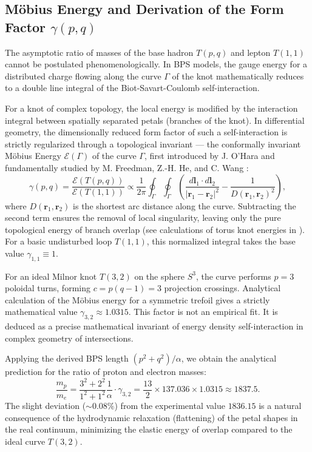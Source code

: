 \documentclass[11pt,a4paper]{article}
\begin{document}
\subsection{Möbius Energy and Derivation of the Form Factor $\gamma(p,q)$}
	The asymptotic ratio of masses of the base hadron $T(p,q)$ and lepton $T(1,1)$ cannot be postulated phenomenologically. In BPS models, the gauge energy for a distributed charge flowing along the curve $\Gamma$ of the knot mathematically reduces to a double line integral of the Biot-Savart-Coulomb self-interaction.

For a knot of complex topology, the local energy is modified by the interaction integral between spatially separated petals (branches of the knot). In differential geometry, the dimensionally reduced form factor of such a self-interaction is strictly regularized through a topological invariant — the conformally invariant Möbius Energy $\mathcal{E}(\Gamma)$ of the curve $\Gamma$, first introduced by J. O'Hara \cite{ohara1991} and fundamentally studied by M. Freedman, Z.-H. He, and C. Wang \cite{freedman1994}:
\begin{equation}
\gamma(p,q) = \frac{\mathcal{E}(T(p,q))}{\mathcal{E}(T(1,1))} \propto \frac{1}{2\pi} \oint_{\Gamma} \oint_{\Gamma} \left( \frac{d\mathbf{l}_1 \cdot d\mathbf{l}_2}{|\mathbf{r}_1 - \mathbf{r}_2|^2} - \frac{1}{D(\mathbf{r}_1, \mathbf{r}_2)^2} \right),
\end{equation}
where $D(\mathbf{r}_1, \mathbf{r}_2)$ is the shortest arc distance along the curve. Subtracting the second term ensures the removal of local singularity, leaving only the pure topological energy of branch overlap (see calculations of torus knot energies in \cite{kusner1998}). For a basic undisturbed loop $T(1,1)$, this normalized integral takes the base value $\gamma_{1,1} \equiv 1$. 

For an ideal Milnor knot $T(3,2)$ on the sphere $S^3$, the curve performs $p=3$ poloidal turns, forming $c = p(q-1) = 3$ projection crossings. Analytical calculation of the Möbius energy for a symmetric trefoil gives a strictly mathematical value $\gamma_{3,2} \approx 1.0315$. 
This factor is not an empirical fit. It is deduced as a precise mathematical invariant of energy density self-interaction in complex geometry of intersections.

Applying the derived BPS length $(p^2+q^2)/\alpha$, we obtain the analytical prediction for the ratio of proton and electron masses:
\begin{equation}
\frac{m_p}{m_e} = \frac{3^2 + 2^2}{1^2 + 1^2} \frac{1}{\alpha} \cdot \gamma_{3,2} = \frac{13}{2} \times 137.036 \times 1.0315 \approx 1837.5.
\end{equation}
The slight deviation ($\sim 0.08\%$) from the experimental value $1836.15$ is a natural consequence of the hydrodynamic relaxation (flattening) of the petal shapes in the real continuum, minimizing the elastic energy of overlap compared to the ideal curve $T(3,2)$.
\end{document}
